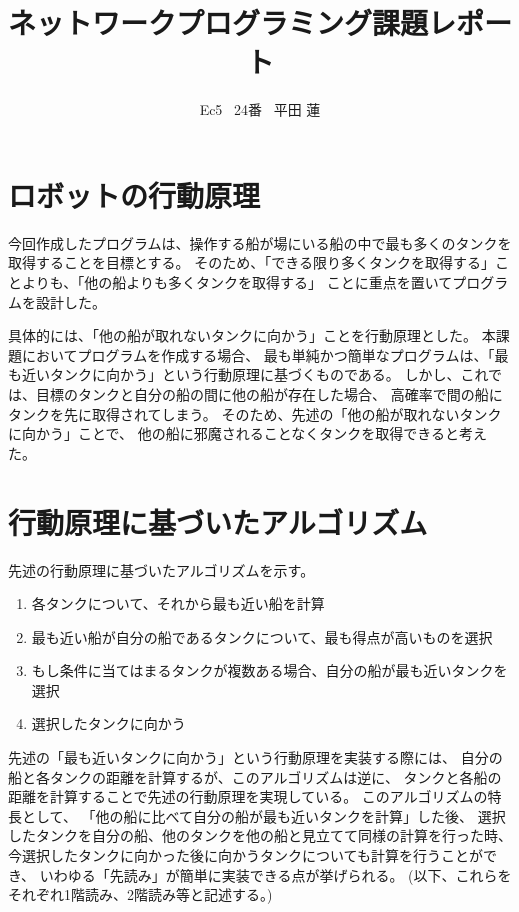 \documentclass[]{jsarticle}
\title{ネットワークプログラミング課題レポート}
\author{Ec5 \ 24番 \ 平田 蓮}
\date{}
\begin{document}
\maketitle

\section{ロボットの行動原理}
    今回作成したプログラムは、操作する船が場にいる船の中で最も多くのタンクを取得することを目標とする。
    そのため、「できる限り多くタンクを取得する」ことよりも、「他の船よりも多くタンクを取得する」
    ことに重点を置いてプログラムを設計した。

    具体的には、「他の船が取れないタンクに向かう」ことを行動原理とした。
    本課題においてプログラムを作成する場合、
    最も単純かつ簡単なプログラムは、「最も近いタンクに向かう」という行動原理に基づくものである。
    しかし、これでは、目標のタンクと自分の船の間に他の船が存在した場合、
    高確率で間の船にタンクを先に取得されてしまう。
    そのため、先述の「他の船が取れないタンクに向かう」ことで、
    他の船に邪魔されることなくタンクを取得できると考えた。

\section{行動原理に基づいたアルゴリズム}
    先述の行動原理に基づいたアルゴリズムを示す。

    \begin{enumerate}
        \item 各タンクについて、それから最も近い船を計算
        \item 最も近い船が自分の船であるタンクについて、最も得点が高いものを選択
        \item もし条件に当てはまるタンクが複数ある場合、自分の船が最も近いタンクを選択
        \item 選択したタンクに向かう
    \end{enumerate}

    先述の「最も近いタンクに向かう」という行動原理を実装する際には、
    自分の船と各タンクの距離を計算するが、このアルゴリズムは逆に、
    タンクと各船の距離を計算することで先述の行動原理を実現している。
    このアルゴリズムの特長として、
    「他の船に比べて自分の船が最も近いタンクを計算」した後、
    選択したタンクを自分の船、他のタンクを他の船と見立てて同様の計算を行った時、
    今選択したタンクに向かった後に向かうタンクについても計算を行うことができ、
    いわゆる「先読み」が簡単に実装できる点が挙げられる。
    (以下、これらをそれぞれ1階読み、2階読み等と記述する。)
    
\end{document}
